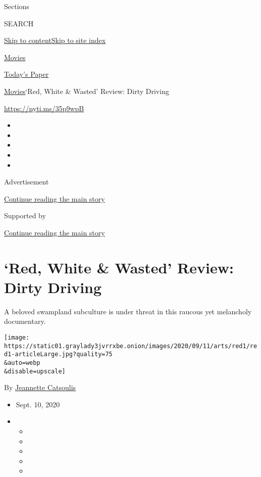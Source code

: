 Sections

SEARCH

\protect\hyperlink{site-content}{Skip to
content}\protect\hyperlink{site-index}{Skip to site index}

\href{https://www.nytimes3xbfgragh.onion/section/movies}{Movies}

\href{https://myaccount.nytimes3xbfgragh.onion/auth/login?response_type=cookie\&client_id=vi}{}

\href{https://www.nytimes3xbfgragh.onion/section/todayspaper}{Today's
Paper}

\href{/section/movies}{Movies}\textbar{}`Red, White \& Wasted' Review:
Dirty Driving

\url{https://nyti.ms/35p9wpB}

\begin{itemize}
\item
\item
\item
\item
\item
\end{itemize}

Advertisement

\protect\hyperlink{after-top}{Continue reading the main story}

Supported by

\protect\hyperlink{after-sponsor}{Continue reading the main story}

\hypertarget{red-white--wasted-review-dirty-driving}{%
\section{`Red, White \& Wasted' Review: Dirty
Driving}\label{red-white--wasted-review-dirty-driving}}

A beloved swampland subculture is under threat in this raucous yet
melancholy documentary.

\texttt{[image: https://static01.graylady3jvrrxbe.onion/images/2020/09/11/arts/red1/red1-articleLarge.jpg?quality=75\\\&auto=webp\\\&disable=upscale]}

By
\href{https://www.nytimes3xbfgragh.onion/by/jeannette-catsoulis}{Jeannette
Catsoulis}

\begin{itemize}
\item
  Sept. 10, 2020
\item
  \begin{itemize}
  \item
  \item
  \item
  \item
  \item
  \end{itemize}
\end{itemize}

